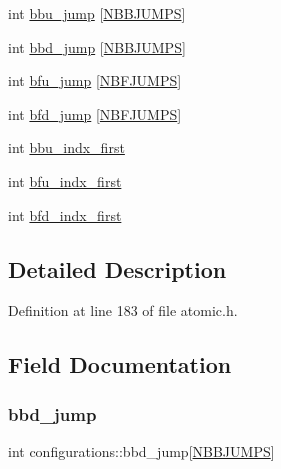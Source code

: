\begin{DoxyCompactItemize}
\item 
int \hyperlink{structconfigurations_adbe6f0e8f48ab2ac418543cd5bbb5d12}{bbu\+\_\+jump} \mbox{[}\hyperlink{atomic_8h_a27e1e039bca1d64c21caa972e1111c09}{N\+B\+B\+J\+U\+M\+PS}\mbox{]}
\item 
int \hyperlink{structconfigurations_a4d26c780eab93bd42aeefef3ddc9fcda}{bbd\+\_\+jump} \mbox{[}\hyperlink{atomic_8h_a27e1e039bca1d64c21caa972e1111c09}{N\+B\+B\+J\+U\+M\+PS}\mbox{]}
\item 
int \hyperlink{structconfigurations_ad7ff676cefd02052bf9ec5a92f37db98}{bfu\+\_\+jump} \mbox{[}\hyperlink{atomic_8h_a0829916f98c17313ddf806ae4a16355e}{N\+B\+F\+J\+U\+M\+PS}\mbox{]}
\item 
int \hyperlink{structconfigurations_a20d66fef678daa8ef52c0b933546e16a}{bfd\+\_\+jump} \mbox{[}\hyperlink{atomic_8h_a0829916f98c17313ddf806ae4a16355e}{N\+B\+F\+J\+U\+M\+PS}\mbox{]}
\item 
int \hyperlink{structconfigurations_a006c163c0458412401d44aca2d8b228d}{bbu\+\_\+indx\+\_\+first}
\item 
int \hyperlink{structconfigurations_a8942d3fe089878881187ced90e2ccc5e}{bfu\+\_\+indx\+\_\+first}
\item 
int \hyperlink{structconfigurations_abc158a8d23c5630e6eedf3a1866af30c}{bfd\+\_\+indx\+\_\+first}
\end{DoxyCompactItemize}


\subsection{Detailed Description}


Definition at line 183 of file atomic.\+h.



\subsection{Field Documentation}
\mbox{\label{structconfigurations_a4d26c780eab93bd42aeefef3ddc9fcda}} 
\subsubsection{\texorpdfstring{bbd\+\_\+jump}{bbd\_jump}}
{\footnotesize\ttfamily int configurations\+::bbd\+\_\+jump\mbox{[}\hyperlink{atomic_8h_a27e1e039bca1d64c21caa972e1111c09}{N\+B\+B\+J\+U\+M\+PS}\mbox{]}}



